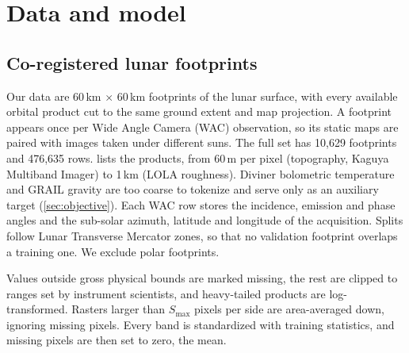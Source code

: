\section{Data and model}
\label{sec:method}

\subsection{Co-registered lunar footprints}
\label{sec:data}

Our data are 60\,km $\times$ 60\,km footprints of the lunar surface, with every available orbital product cut to the same ground extent and map projection. A footprint appears once per Wide Angle Camera (WAC) observation, so its static maps are paired with images taken under different suns. The full set has 10,629 footprints and 476,635 rows.  lists the products, from 60\,m per pixel (topography, Kaguya Multiband Imager) to 1\,km (LOLA roughness). Diviner bolometric temperature and GRAIL gravity are too coarse to tokenize and serve only as an auxiliary target (\cref{sec:objective}). Each WAC row stores the incidence, emission and phase angles and the sub-solar azimuth, latitude and longitude of the acquisition. Splits follow Lunar Transverse Mercator zones, so that no validation footprint overlaps a training one. We exclude polar footprints. 

Values outside gross physical bounds are marked missing, the rest are clipped to ranges set by instrument scientists, and heavy-tailed products are log-transformed. Rasters larger than $S_{\max}$ pixels per side are area-averaged down, ignoring missing pixels. Every band is standardized with training statistics, and missing pixels are then set to zero, the mean.

